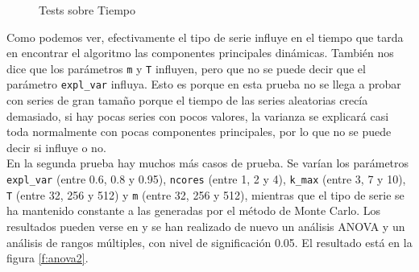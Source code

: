 \begin{figure}
 \centering
    \newline
    \centering
 \caption{Tests sobre Tiempo}
 \label{f:anova1}
\end{figure}

Como podemos ver, efectivamente el tipo de serie influye en el tiempo que tarda en encontrar el algoritmo las componentes principales dinámicas. También nos dice que los parámetros \texttt{m} y \texttt{T} influyen, pero que no se puede decir que el parámetro \texttt{expl\_var} influya. Esto es porque en esta prueba no se llega a probar con series de gran tamaño porque el tiempo de las series aleatorias crecía demasiado, si hay pocas series con pocos valores, la varianza se explicará casi toda normalmente con pocas componentes principales, por lo que no se puede decir si influye o no.\\

En la segunda prueba hay muchos más casos de prueba. Se varían los parámetros \texttt{expl\_var} (entre 0.6, 0.8 y 0.95), \texttt{ncores} (entre 1, 2 y 4), \texttt{k\_max} (entre 3, 7 y 10), \texttt{T} (entre 32, 256 y 512) y \texttt{m} (entre 32, 256 y 512), mientras que el tipo de serie se ha mantenido constante a las generadas por el método de Monte Carlo. Los resultados pueden verse en %
y se han realizado de nuevo un análisis ANOVA y un análisis de rangos múltiples, con nivel de significación 0.05. El resultado está en la figura \ref{f:anova2}.\\

